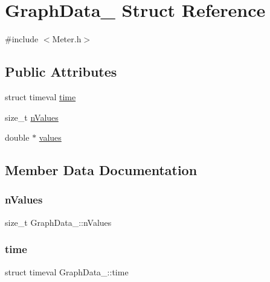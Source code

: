 \hypertarget{structGraphData__}{}\section{Graph\+Data\+\_\+ Struct Reference}
\label{structGraphData__}


{\ttfamily \#include $<$Meter.\+h$>$}

\subsection*{Public Attributes}
\begin{DoxyCompactItemize}
\item 
struct timeval \hyperlink{structGraphData___af1af1e24521fa9cdf9fa747cbf010595}{time}
\item 
size\+\_\+t \hyperlink{structGraphData___a0fb5ac9456cbfe844ccedaf723440eec}{n\+Values}
\item 
double $\ast$ \hyperlink{structGraphData___a34c1246c20fd13e38b4ac8aacf5f6004}{values}
\end{DoxyCompactItemize}


\subsection{Member Data Documentation}
\mbox{\label{structGraphData___a0fb5ac9456cbfe844ccedaf723440eec}} 
\subsubsection{\texorpdfstring{n\+Values}{nValues}}
{\footnotesize\ttfamily size\+\_\+t Graph\+Data\+\_\+\+::n\+Values}

\mbox{\label{structGraphData___af1af1e24521fa9cdf9fa747cbf010595}} 
\subsubsection{\texorpdfstring{time}{time}}
{\footnotesize\ttfamily struct timeval Graph\+Data\+\_\+\+::time}

\mbox{\label{structGraphData___a34c1246c20fd13e38b4ac8aacf5f6004}} 
